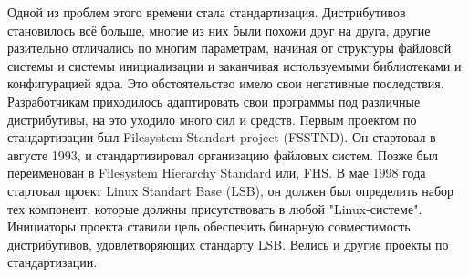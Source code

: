 \documentclass[bachelor, och, referat, times]{SCWorks}
\begin{document}
\par Одной из проблем этого времени стала стандартизация. Дистрибутивов становилось всё больше, многие из них были похожи друг на друга, другие разительно отличались по многим параметрам, начиная от структуры файловой системы и системы инициализации и заканчивая используемыми библиотеками и конфигурацией ядра. Это обстоятельство имело свои негативные последствия. Разработчикам приходилось адаптировать свои программы под различные дистрибутивы, на это уходило много сил и средств. Первым проектом по стандартизации был Filesystem Standart project (FSSTND). Он стартовал в августе 1993, и стандартизировал организацию файловых систем. Позже был переименован в Filesystem Hierarchy Standard или, FHS. В мае 1998 года стартовал проект Linux Standart Base (LSB), он должен был определить набор тех компонент, которые должны присутствовать в любой "Linux-системе". Инициаторы проекта ставили цель обеспечить бинарную совместимость дистрибутивов, удовлетворяющих стандарту LSB. Велись и другие проекты по стандартизации.
\end{document}
